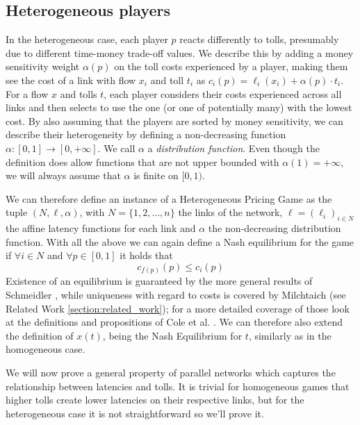 \documentclass[10pt,a4paper]{book}
\theoremstyle{definition}
\theoremstyle{comment}
\begin{document}
\subsection*{Heterogeneous players}

In the heterogeneous case, each player $p$ reacts differently to tolls, presumably due to different time-money trade-off values.
We describe this by adding a money sensitivity weight $\alpha(p)$ on the toll costs experienced by a player, making them see the cost of a link with flow $x_i$ and toll $t_i$ as $c_i(p) = \ell_i(x_i) + \alpha(p) \cdot t_i$.
For a flow $x$ and tolls $t$, each player considers their costs experienced across all links and then selects to use the one (or one of potentially many) with the lowest cost. 
By also assuming that the players are sorted by money sensitivity, we can describe their heterogeneity by defining a non-decreasing function $\alpha: [0, 1] \rightarrow [0, +\infty]$.
We call $\alpha$ a \textit{distribution function}.
Even though the definition does allow functions that are not upper bounded with $\alpha(1) = +\infty$, we will always assume that $\alpha$ is finite on $[0, 1)$.

We can therefore define an instance of a Heterogeneous Pricing Game as the tuple $(N, \ell, \alpha)$, with $N = \{1, 2, \dots, n\}$ the links of the network, $\ell = (\ell_i)_{i \in N}$ the affine latency functions for each link and $\alpha$ the non-decreasing distribution function.
With all the above we can again define a Nash equilibrium for the game if $\forall i \in N$ and $\forall p \in [0, 1]$ it holds that
\[c_{f(p)}(p) \leq c_i(p)\]
Existence of an equilibrium is guaranteed by the more general results of Schmeidler \cite[Thm 2]{1973JSP.....7..295S}, while uniqueness with regard to costs is covered by Milchtaich \cite[Prop 3.3]{doi:10.1287/moor.25.3.349.12220} (see Related Work \ref{section:related_work}); for a more detailed coverage of those look at the definitions and propositions of Cole et al. \cite[\S2]{10.1145/780542.780618}.
We can therefore also extend the definition of $x(t)$, being the Nash Equilibrium for $t$, similarly as in the homogeneous case.

We will now prove a general property of parallel networks which captures the relationship between latencies and tolls.
It is trivial for homogeneous games that higher tolls create lower latencies on their respective links, but for the heterogeneous case it is not straightforward so we'll prove it.
\end{document}
